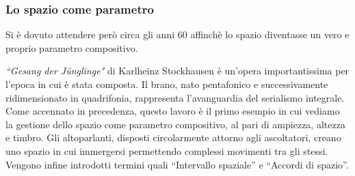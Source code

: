 \subsubsection{Lo spazio come parametro}
Si è dovuto attendere però circa gli anni 60 affinchè lo spazio diventasse un vero e proprio parametro compositivo.

\emph{“Gesang der Jünglinge"} di Karlheinz Stockhausen è un’opera importantissima per l’epoca in cui è stata composta. Il brano, nato pentafonico e successivamente ridimensionato in quadrifonia, rappresenta l’avanguardia del serialismo integrale. Come accennato in precedenza, questo lavoro è il primo esempio in cui vediamo la gestione dello spazio come parametro compositivo, al pari di ampiezza, altezza e timbro.
Gli altoparlanti, disposti circolarmente attorno agli ascoltatori, creano uno spazio in cui immergersi permettendo complessi movimenti tra gli stessi.
Vengono infine introdotti termini quali “Intervallo spaziale” e “Accordi di spazio”.
